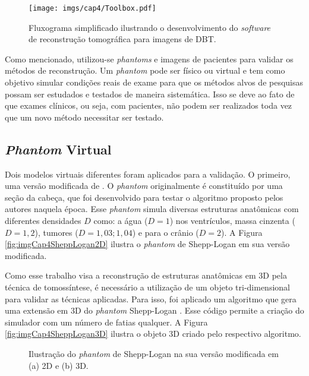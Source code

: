 \begin{figure}[H]
	\caption{Fluxograma simplificado ilustrando o desenvolvimento do \textit{software} de reconstrução tomográfica para imagens de \acs{DBT}.}
	\begin{center}
		\texttt{[image: imgs/cap4/Toolbox.pdf]}
	\end{center}
	\label{fig:imgCap4Toolbox}
\end{figure}

Como mencionado, utilizou-se \textit{phantoms} e imagens de pacientes para validar os métodos de reconstrução. Um \textit{phantom} pode ser físico ou virtual e tem como objetivo simular condições reais de exame para que os métodos alvos de pesquisas possam ser estudados e testados de maneira sistemática. Isso se deve ao fato de que exames clínicos, ou seja, com pacientes, não podem ser realizados toda vez que um novo método necessitar ser testado.

\subsection{\textit{Phantom} Virtual}

Dois modelos virtuais diferentes foram aplicados para a validação.  O primeiro, uma versão modificada de . O \textit{phantom} originalmente é constituído por uma seção da cabeça, que foi desenvolvido para testar o algoritmo proposto pelos autores naquela época. Esse \textit{phantom} simula diversas estruturas anatômicas com diferentes densidades $D$ como: a água ($D=1$) nos ventrículos, massa cinzenta ($D=1,2$), tumores ($D=1,03;1,04$) e para o crânio ($D=2$). A Figura \ref{fig:imgCap4SheppLogan2D} ilustra o \textit{phantom} de Shepp-Logan em sua versão modificada.

Como esse trabalho visa a reconstrução de estruturas anatômicas em \acs{3D} pela técnica de tomossíntese, é necessário a utilização de um objeto tri-dimensional para validar as técnicas aplicadas. Para isso, foi aplicado um algoritmo que gera uma extensão em \acs{3D} do \textit{phantom} Shepp-Logan \cite{Schabel2006}. Esse código permite a criação do simulador com um número de fatias qualquer. A Figura \ref{fig:imgCap4SheppLogan3D} ilustra o objeto \acs{3D} criado pelo respectivo algoritmo.

\begin{figure}[htb]
	\centering
	
	\caption{Ilustração do \textit{phantom} de Shepp-Logan na sua versão modificada em (a) \acs{2D} e (b) \acs{3D}.}
	
	\hfil
	
	\label{fig:imgCap4SheppLogan}
\end{figure}

